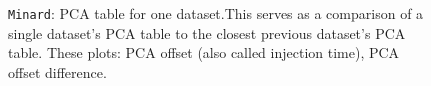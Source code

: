 \documentclass[12pt]{article}
\begin{document}
\begin{figure}
\centering
\noindent{}
  \caption{\centering \texttt{Minard}: PCA table for one dataset.\hspace{\textwidth}This serves as a comparison of a single dataset's PCA table to the closest previous dataset's PCA table. These plots: PCA offset (also called injection time), PCA offset difference.}
  \label{fig:tab2}
\end{figure}
\end{document}

